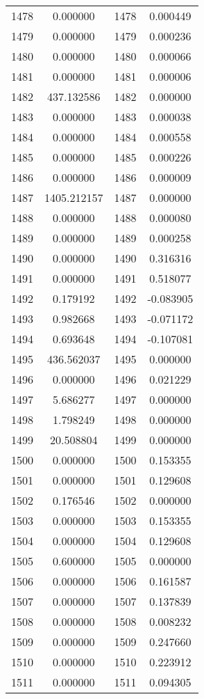 \documentclass[12pt]{article}
\begin{document}
\begin{longtable}{@{}cccc@{}}
1478 & 0.000000 & 1478 & 0.000449 \\
1479 & 0.000000 & 1479 & 0.000236 \\
1480 & 0.000000 & 1480 & 0.000066 \\
1481 & 0.000000 & 1481 & 0.000006 \\
1482 & 437.132586 & 1482 & 0.000000 \\
1483 & 0.000000 & 1483 & 0.000038 \\
1484 & 0.000000 & 1484 & 0.000558 \\
1485 & 0.000000 & 1485 & 0.000226 \\
1486 & 0.000000 & 1486 & 0.000009 \\
1487 & 1405.212157 & 1487 & 0.000000 \\
1488 & 0.000000 & 1488 & 0.000080 \\
1489 & 0.000000 & 1489 & 0.000258 \\
1490 & 0.000000 & 1490 & 0.316316 \\
1491 & 0.000000 & 1491 & 0.518077 \\
1492 & 0.179192 & 1492 & -0.083905 \\
1493 & 0.982668 & 1493 & -0.071172 \\
1494 & 0.693648 & 1494 & -0.107081 \\
1495 & 436.562037 & 1495 & 0.000000 \\
1496 & 0.000000 & 1496 & 0.021229 \\
1497 & 5.686277 & 1497 & 0.000000 \\
1498 & 1.798249 & 1498 & 0.000000 \\
1499 & 20.508804 & 1499 & 0.000000 \\
1500 & 0.000000 & 1500 & 0.153355 \\
1501 & 0.000000 & 1501 & 0.129608 \\
1502 & 0.176546 & 1502 & 0.000000 \\
1503 & 0.000000 & 1503 & 0.153355 \\
1504 & 0.000000 & 1504 & 0.129608 \\
1505 & 0.600000 & 1505 & 0.000000 \\
1506 & 0.000000 & 1506 & 0.161587 \\
1507 & 0.000000 & 1507 & 0.137839 \\
1508 & 0.000000 & 1508 & 0.008232 \\
1509 & 0.000000 & 1509 & 0.247660 \\
1510 & 0.000000 & 1510 & 0.223912 \\
1511 & 0.000000 & 1511 & 0.094305 \\

\end{longtable}
\end{document}
